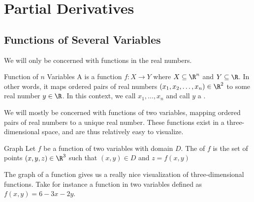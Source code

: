 \chapter{Partial Derivatives}

\section{Functions of Several Variables}

We will only be concerned with functions in the real numbers.

\begin{dfnbox}{Function of $n$ Variables}{}
A  is a function $f : X \to Y$ where $X \subseteq \R^n$ and $Y \subseteq \R$. In other words, it maps ordered pairs of real numbers $(x_1, x_2, \ldots, x_n) \in \R^2$ to some real number $y \in \R$. In this context, we call $x_1, \ldots, x_n$  and call $y$ a .
\end{dfnbox}

We will mostly be concerned with functions of two variables, mapping ordered pairs of real numbers to a unique real number. These functions exist in a three-dimensional space, and are thus relatively easy to visualize.

\begin{dfnbox}{Graph}{}
    Let $f$ be a function of two variables with domain $D$. The  of $f$ is the set of points $(x,y,z) \in \R^3$ such that $(x,y) \in D$ and $z = f(x,y)$
\end{dfnbox}

The graph of a function gives us a really nice visualization of three-dimensional functions. Take for instance a function in two variables defined as $f(x,y) = 6 - 3x - 2y$. 




